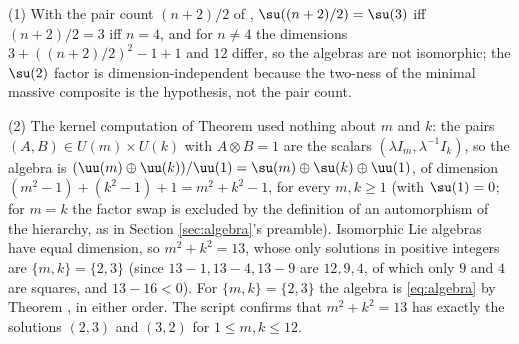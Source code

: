 (1) With the pair count $(n+2)/2$ of , $\su((n+2)/2) = \su(3)$ iff $(n+2)/2 = 3$ iff $n = 4$, and for $n \neq 4$ the dimensions $3 + ((n+2)/2)^{2} - 1 + 1$ and $12$ differ, so the algebras are not isomorphic; the $\su(2)$ factor is dimension-independent because the two-ness of the minimal massive composite is the hypothesis, not the pair count.

(2) The kernel computation of Theorem  used nothing about $m$ and $k$: the pairs $(A, B) \in U(m) \times U(k)$ with $A \otimes B = 1$ are the scalars $(\lambda I_{m}, \lambda^{-1}I_{k})$, so the algebra is $(\uu(m) \oplus \uu(k))/\uu(1) = \su(m) \oplus \su(k) \oplus \uu(1)$, of dimension $(m^{2} - 1) + (k^{2} - 1) + 1 = m^{2} + k^{2} - 1$, for every $m, k \ge 1$ (with $\su(1) = 0$; for $m = k$ the factor swap is excluded by the definition of an automorphism of the hierarchy, as in Section \ref{sec:algebra}'s preamble). Isomorphic Lie algebras have equal dimension, so $m^{2} + k^{2} = 13$, whose only solutions in positive integers are $\{m, k\} = \{2, 3\}$ (since $13 - 1, 13 - 4, 13 - 9$ are $12, 9, 4$, of which only $9$ and $4$ are squares, and $13 - 16 < 0$). For $\{m, k\} = \{2, 3\}$ the algebra is \eqref{eq:algebra} by Theorem , in either order. The script confirms that $m^{2} + k^{2} = 13$ has exactly the solutions $(2, 3)$ and $(3, 2)$ for $1 \le m, k \le 12$.
